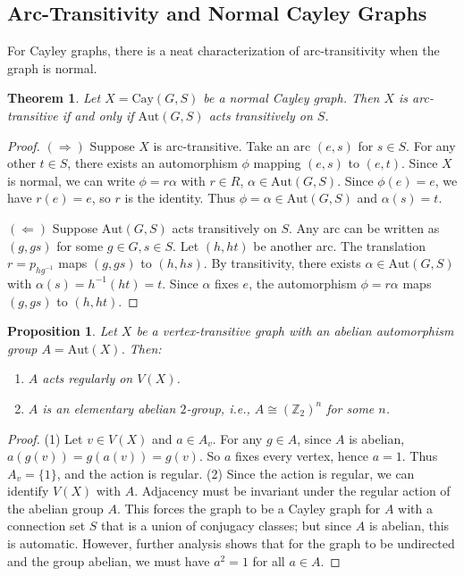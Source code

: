 \documentclass[12pt,a4paper,openany]{book}
\newtheorem{theorem}{Theorem}[section]
\newtheorem{proposition}{Proposition}[section]
\begin{document}
\subsection{Arc-Transitivity and Normal Cayley Graphs}

For Cayley graphs, there is a neat characterization of arc-transitivity when the graph is normal.

\begin{theorem}\label{thm:normal-arc-transitive}
Let $X = \mathrm{Cay}(G, S)$ be a normal Cayley graph. Then $X$ is arc-transitive if and only if $\mathrm{Aut}(G,S)$ acts transitively on $S$.
\end{theorem}
\begin{proof}
$(\Rightarrow)$ Suppose $X$ is arc-transitive. Take an arc $(e, s)$ for $s \in S$. For any other $t \in S$, there exists an automorphism $\phi$ mapping $(e, s)$ to $(e, t)$. Since $X$ is normal, we can write $\phi = r \alpha$ with $r \in R$, $\alpha \in \mathrm{Aut}(G,S)$. Since $\phi(e) = e$, we have $r(e)=e$, so $r$ is the identity. Thus $\phi = \alpha \in \mathrm{Aut}(G,S)$ and $\alpha(s) = t$.

$(\Leftarrow)$ Suppose $\mathrm{Aut}(G,S)$ acts transitively on $S$. Any arc can be written as $(g, gs)$ for some $g \in G, s \in S$. Let $(h, ht)$ be another arc. The translation $r = p_{hg^{-1}}$ maps $(g, gs)$ to $(h, hs)$. By transitivity, there exists $\alpha \in \mathrm{Aut}(G,S)$ with $\alpha(s) = h^{-1}(ht) = t$. Since $\alpha$ fixes $e$, the automorphism $\phi = r \alpha$ maps $(g, gs)$ to $(h, ht)$.
\end{proof}

\begin{proposition}
Let $X$ be a vertex-transitive graph with an abelian automorphism group $A = \mathrm{Aut}(X)$. Then:
\begin{enumerate}
    \item $A$ acts regularly on $V(X)$.
    \item $A$ is an elementary abelian $2$-group, i.e., $A \cong (\mathbb{Z}_2)^n$ for some $n$.
\end{enumerate}
\end{proposition}
\begin{proof}
(1) Let $v \in V(X)$ and $a \in A_v$. For any $g \in A$, since $A$ is abelian, $a(g(v)) = g(a(v)) = g(v)$. So $a$ fixes every vertex, hence $a = 1$. Thus $A_v = \{1\}$, and the action is regular.
(2) Since the action is regular, we can identify $V(X)$ with $A$. Adjacency must be invariant under the regular action of the abelian group $A$. This forces the graph to be a Cayley graph for $A$ with a connection set $S$ that is a union of conjugacy classes; but since $A$ is abelian, this is automatic. However, further analysis shows that for the graph to be undirected and the group abelian, we must have $a^2 = 1$ for all $a \in A$.
\end{proof}
\end{document}
